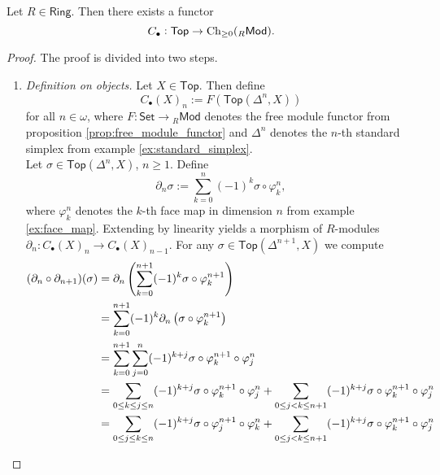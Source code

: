 \begin{theorem}
	\label{thm:singular_chain_complex_functor}
	Let $R \in \mathsf{Ring}$. Then there exists a functor 
	\begin{equation*}
		C_\bullet : \mathsf{Top} \to \operatorname{Ch}_{\geq 0}({_R}\mathsf{Mod}).
	\end{equation*}
\end{theorem}

\begin{proof}
	The proof is divided into two steps.
	\begin{enumerate}[label = \textit{Step \arabic*:},wide = 0pt]
		\item \textit{Definition on objects.} Let $X \in \mathsf{Top}$. Then define 
			\begin{equation*}
				C_\bullet(X)_n := F(\mathsf{Top}(\Delta^n,X))
			\end{equation*}
			\noindent for all $n \in \omega$, where $F : \mathsf{Set} \to {_R}\mathsf{Mod}$ denotes the free module functor from proposition \ref{prop:free_module_functor} and $\Delta^n$ denotes the $n$-th standard simplex from example \ref{ex:standard_simplex}.\\
			Let $\sigma \in \mathsf{Top}(\Delta^n,X)$, $n \geq 1$. Define
			\begin{equation}
				\label{eq:boundary_map}
				\partial_n \sigma := \sum_{k = 0}^n (-1)^k \sigma \circ \varphi^n_k,
			\end{equation}
			\noindent where $\varphi^n_k$ denotes the $k$-th face map in dimension $n$ from example \ref{ex:face_map}. Extending by linearity yields a morphism of $R$-modules $\partial_n : C_\bullet(X)_n \to C_\bullet(X)_{n - 1}$. For any $\sigma \in \mathsf{Top}(\Delta^{n + 1},X)$ we compute
			\begin{align*}
				(\partial_n \circ \partial_{n + 1})(\sigma) &= \partial_n \del[4]{\sum_{k = 0}^{n + 1} (-1)^k \sigma \circ \varphi^{n + 1}_k}\\
				&= \sum_{k = 0}^{n + 1} (-1)^k \partial_n\del[1]{\sigma \circ \varphi^{n + 1}_k}\\
				&= \sum_{k = 0}^{n + 1}\sum_{j = 0}^n (-1)^{k + j} \sigma \circ \varphi^{n + 1}_k \circ \varphi^n_j\\
				&= \sum_{0 \leq k \leq j \leq n}(-1)^{k + j} \sigma \circ \varphi^{n + 1}_k \circ \varphi^n_j + \sum_{0 \leq j < k \leq n + 1}(-1)^{k + j} \sigma \circ \varphi^{n + 1}_k \circ \varphi^n_j\\
				&= \sum_{0 \leq j \leq k \leq n}(-1)^{k + j} \sigma \circ \varphi^{n + 1}_j \circ \varphi^n_k + \sum_{0 \leq j <k \leq n + 1}(-1)^{k + j} \sigma \circ \varphi^{n + 1}_k \circ \varphi^n_j\\

\end{align*}
\end{enumerate}
\end{proof}
